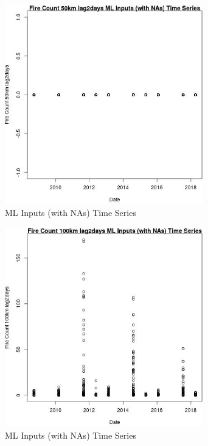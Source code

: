 \begin{figure} 
\centering  
\includegraphics[width=0.77\textwidth]{Code_Outputs/Report_ML_input_PM25_Step4_part_e_de_duplicated_aves_compiled_2019-05-18wNAs_Fire_Count_50km_lag2daysvDate.jpg} 
\caption{\label{fig:Report_ML_input_PM25_Step4_part_e_de_duplicated_aves_compiled_2019-05-18wNAsFire_Count_50km_lag2daysvDate}ML Inputs (with NAs) Time Series} 
\end{figure} 
 

\begin{figure} 
\centering  
\includegraphics[width=0.77\textwidth]{Code_Outputs/Report_ML_input_PM25_Step4_part_e_de_duplicated_aves_compiled_2019-05-18wNAs_Fire_Count_100km_lag2daysvDate.jpg} 
\caption{\label{fig:Report_ML_input_PM25_Step4_part_e_de_duplicated_aves_compiled_2019-05-18wNAsFire_Count_100km_lag2daysvDate}ML Inputs (with NAs) Time Series} 
\end{figure} 
 

